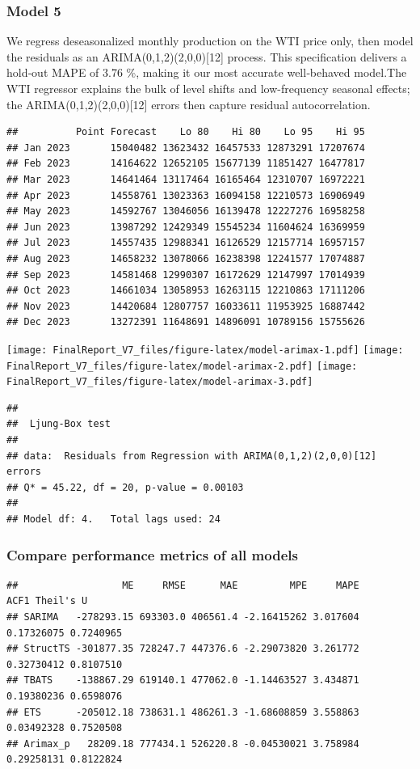 \documentclass[
]{article}
\begin{document}
\subsubsection{Model 5}\label{model-5}

We regress deseasonalized monthly production on the WTI price only, then
model the residuals as an ARIMA(0,1,2)(2,0,0){[}12{]} process. This
specification delivers a hold‐out MAPE of 3.76 \%, making it our most
accurate well‐behaved model.The WTI regressor explains the bulk of level
shifts and low-frequency seasonal effects; the
ARIMA(0,1,2)(2,0,0){[}12{]} errors then capture residual
autocorrelation.

\begin{verbatim}
##          Point Forecast    Lo 80    Hi 80    Lo 95    Hi 95
## Jan 2023       15040482 13623432 16457533 12873291 17207674
## Feb 2023       14164622 12652105 15677139 11851427 16477817
## Mar 2023       14641464 13117464 16165464 12310707 16972221
## Apr 2023       14558761 13023363 16094158 12210573 16906949
## May 2023       14592767 13046056 16139478 12227276 16958258
## Jun 2023       13987292 12429349 15545234 11604624 16369959
## Jul 2023       14557435 12988341 16126529 12157714 16957157
## Aug 2023       14658232 13078066 16238398 12241577 17074887
## Sep 2023       14581468 12990307 16172629 12147997 17014939
## Oct 2023       14661034 13058953 16263115 12210863 17111206
## Nov 2023       14420684 12807757 16033611 11953925 16887442
## Dec 2023       13272391 11648691 14896091 10789156 15755626
\end{verbatim}

\texttt{[image: FinalReport\_V7\_files/figure-latex/model-arimax-1.pdf]}
\texttt{[image: FinalReport\_V7\_files/figure-latex/model-arimax-2.pdf]}
\texttt{[image: FinalReport\_V7\_files/figure-latex/model-arimax-3.pdf]}

\begin{verbatim}
## 
##  Ljung-Box test
## 
## data:  Residuals from Regression with ARIMA(0,1,2)(2,0,0)[12] errors
## Q* = 45.22, df = 20, p-value = 0.00103
## 
## Model df: 4.   Total lags used: 24
\end{verbatim}

\subsubsection{Compare performance metrics of all
models}\label{compare-performance-metrics-of-all-models}

\begin{verbatim}
##                  ME     RMSE      MAE         MPE     MAPE       ACF1 Theil's U
## SARIMA   -278293.15 693303.0 406561.4 -2.16415262 3.017604 0.17326075 0.7240965
## StructTS -301877.35 728247.7 447376.6 -2.29073820 3.261772 0.32730412 0.8107510
## TBATS    -138867.29 619140.1 477062.0 -1.14463527 3.434871 0.19380236 0.6598076
## ETS      -205012.18 738631.1 486261.3 -1.68608859 3.558863 0.03492328 0.7520508
## Arimax_p   28209.18 777434.1 526220.8 -0.04530021 3.758984 0.29258131 0.8122824
\end{verbatim}
\end{document}
